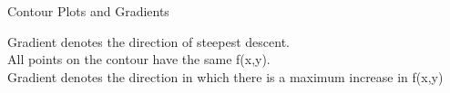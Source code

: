 \documentclass{beamer}
\begin{document}
\begin{frame}{Contour Plots and Gradients}
    
    Gradient denotes the direction of steepest descent.\\
    All points on the contour have the same f(x,y).\\
    Gradient denotes the direction in which there is a maximum increase in f(x,y)\\

\end{frame}
\end{document}
